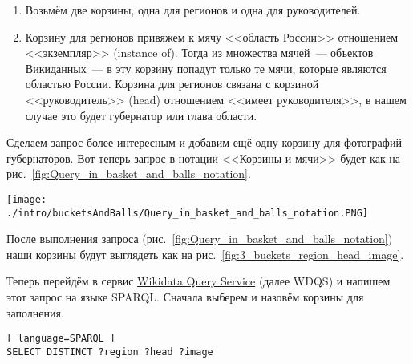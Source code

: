 \begin{enumerate}
    \item Возьмём две корзины, одна для регионов и одна для руководителей.
    \item Корзину для регионов привяжем к мячу <<область России>> отношением <<экземпляр>> (instance of). Тогда из множества мячей~--- объектов Викиданных~--- в эту корзину попадут только те мячи, которые являются областью России. Корзина для регионов связана с корзиной <<руководитель>> (head) отношением <<имеет руководителя>>, в нашем случае это будет губернатор или глава области.
\end{enumerate}

Сделаем запрос более интересным и добавим ещё одну корзину для фотографий губернаторов. Вот теперь запрос в нотации <<Корзины и мячи>> будет как на рис.~\ref{fig:Query_in_basket_and_balls_notation}.

\begin{figure*}[h!]
    \texttt{[image: ./intro/bucketsAndBalls/Query\_in\_basket\_and\_balls\_notation.PNG]}
    \caption{Запрос в нотации <<Корзины и мячи>> для заполнения корзин <<регион>> мячами <<область России>>, <<руководитель>>~--- губернаторами или главами области, <<изображение>>~--- их фотографиями.}
	\label{fig:Query_in_basket_and_balls_notation}
\end{figure*}

\newpage
После выполнения запроса (рис.~\ref{fig:Query_in_basket_and_balls_notation}) наши корзины будут выглядеть как на рис.~\ref{fig:3_buckets_region_head_image}.

\begin{marginfigure}
	{
		\setlength{\fboxsep}{0pt}%
		\setlength{\fboxrule}{1pt}%
	}
    \caption{Корзины после выполнении запроса на рис.~\ref{fig:Query_in_basket_and_balls_notation}. \textit{``?region``}~--- это области России, \textit{``?head``}~--- это руководители, \textit{``?image``}~--- это фотографии руководства.}
	\label{fig:3_buckets_region_head_image}
\end{marginfigure}

Теперь перейдём в сервис \href{https://query.wikidata.org/}{Wikidata Query Service} (далее WDQS)  и напишем этот запрос на языке SPARQL. Сначала выберем и назовём корзины для заполнения.

\begin{lstlisting}[ language=SPARQL ]
SELECT DISTINCT ?region ?head ?image
\end{lstlisting}

